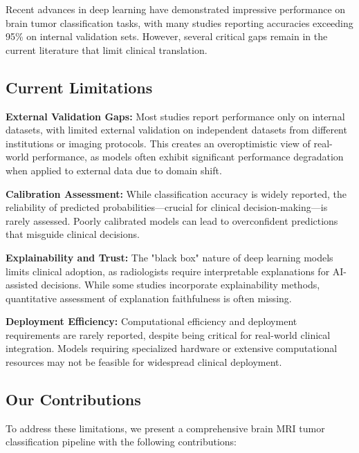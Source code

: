 \documentclass[11pt,a4paper]{article}
\begin{document}
Recent advances in deep learning have demonstrated impressive performance on brain tumor classification tasks, with many studies reporting accuracies exceeding 95\% on internal validation sets. However, several critical gaps remain in the current literature that limit clinical translation.

\subsection{Current Limitations}

\textbf{External Validation Gaps:} Most studies report performance only on internal datasets, with limited external validation on independent datasets from different institutions or imaging protocols. This creates an overoptimistic view of real-world performance, as models often exhibit significant performance degradation when applied to external data due to domain shift.

\textbf{Calibration Assessment:} While classification accuracy is widely reported, the reliability of predicted probabilities—crucial for clinical decision-making—is rarely assessed. Poorly calibrated models can lead to overconfident predictions that misguide clinical decisions.

\textbf{Explainability and Trust:} The "black box" nature of deep learning models limits clinical adoption, as radiologists require interpretable explanations for AI-assisted decisions. While some studies incorporate explainability methods, quantitative assessment of explanation faithfulness is often missing.

\textbf{Deployment Efficiency:} Computational efficiency and deployment requirements are rarely reported, despite being critical for real-world clinical integration. Models requiring specialized hardware or extensive computational resources may not be feasible for widespread clinical deployment.

\subsection{Our Contributions}

To address these limitations, we present a comprehensive brain MRI tumor classification pipeline with the following contributions:
\end{document}
